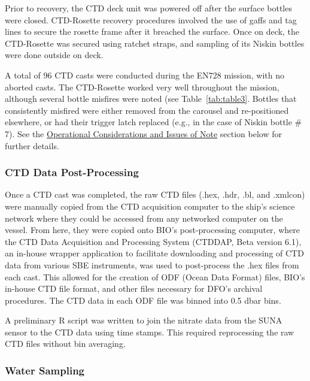 \documentclass[12pt]{article}\usepackage[]{graphicx}\usepackage[]{color}
\begin{document}
Prior to recovery, the CTD deck unit was powered off after the surface bottles were closed. CTD-Rosette recovery procedures involved the use of gaffs and tag lines to secure the rosette frame after it breached the surface. Once on deck, the CTD-Rosette was secured using ratchet straps, and sampling of its Niskin bottles were done outside on deck.

A total of 96 CTD casts were conducted during the EN728 mission, with no aborted casts. The CTD-Rosette worked very well throughout the mission, although several bottle misfires were noted (see Table~\ref{tab:table3}. Bottles that consistently misfired were either removed from the carousel and re-positioned elsewhere, or had their trigger latch replaced (e.g., in the case of Niskin bottle \# 7). See the \hyperref[operation-issues]{Operational Considerations and Issues of Note} section below for further details.

\subsubsection{CTD Data Post-Processing}\label{ctd-data-post-processing}

Once a CTD cast was completed, the raw CTD files (.hex, .hdr, .bl, and .xmlcon) were manually copied from the CTD acquisition computer to the ship's science network where they could be accessed from any networked computer on the vessel. From here, they were copied onto BIO's post-processing computer, where the CTD Data Acquisition and Processing System (CTDDAP, Beta version 6.1), an in-house wrapper application to facilitate downloading and processing of CTD data from various SBE instruments, was used to post-process the .hex files from each cast. This allowed for the creation of ODF (Ocean Data Format) files, BIO's in-house CTD file format, and other files necessary for DFO's archival procedures. The CTD data in each ODF file was binned into 0.5 dbar bins.

A preliminary R script was written to join the nitrate data from the SUNA sensor to the CTD data using time stamps. This required reprocessing the raw CTD files without bin averaging.

\subsubsection{Water Sampling}\label{water-sampling}
\end{document}
